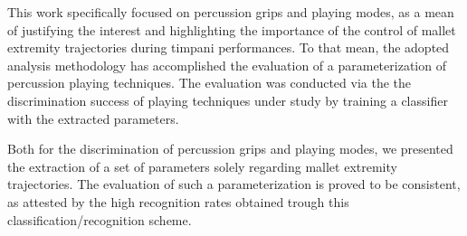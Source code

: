 This work specifically focused on percussion grips and playing modes, as a mean of justifying the interest and highlighting the importance of the control of mallet extremity trajectories during timpani performances. To that mean, the adopted analysis methodology has accomplished the evaluation of a parameterization of percussion playing techniques. The evaluation was conducted via the the discrimination success of playing techniques under study by training a classifier with the extracted parameters.

Both for the discrimination of percussion grips and playing modes, we presented the extraction of a set of parameters solely regarding mallet extremity trajectories. The evaluation of such a parameterization is proved to be consistent, as attested by the high recognition rates obtained trough this classification/recognition scheme.\\


